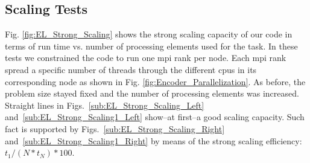 {\subsection{ Scaling Tests}

Fig. \ref{fig:EL_Strong_Scaling} shows the strong scaling capacity of our code in terms of run time vs. number of processing elements used for the task. In these tests we constrained the code to run one \gls{mpi} rank per node. Each \gls{mpi} rank spread a specific number of threads through the different \glspl{cpu} in its corresponding node as shown in Fig. \ref{fig:Encoder_Parallelization}. As before, the problem size stayed fixed and the number of processing elements was increased. Straight lines in Figs.~\ref{sub:EL_Strong_Scaling_Left} and~\ref{sub:EL_Strong_Scaling1_Left} show--at first--a good scaling capacity. Such fact is supported by Figs.~\ref{sub:EL_Strong_Scaling_Right} and~\ref{sub:EL_Strong_Scaling1_Right} by means of the strong scaling efficiency: $t_1 / (N * t_N) * 100$.

}

